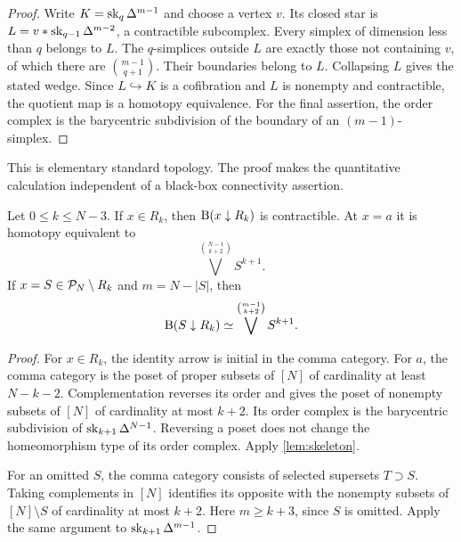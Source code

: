 \begin{proof}
Write $K=\operatorname{sk}_q\Delta^{m-1}$ and choose a vertex $v$. Its closed star is
$L=v*\operatorname{sk}_{q-1}\Delta^{m-2}$, a contractible subcomplex. Every simplex
of dimension less than $q$ belongs to $L$. The $q$-simplices outside $L$
are exactly those not containing $v$, of which there are
$\binom{m-1}{q+1}$. Their boundaries belong to $L$. Collapsing $L$
gives the stated wedge. Since $L\hookrightarrow K$ is a cofibration and
$L$ is nonempty and contractible, the quotient map is a homotopy
equivalence. For the final assertion, the order complex is the barycentric
subdivision of the boundary of an $(m-1)$-simplex.
\end{proof}

This is elementary standard topology. The proof makes the quantitative
calculation independent of a black-box connectivity assertion.

\begin{lemma}\label{lem:nerve}
Let $0\leq k\leq N-3$. If $x\in R_k$, then
$\mathrm B(x\downarrow R_k)$ is contractible. At $x=a$ it is homotopy
equivalent to
\begin{equation}\label{eq:anervecalc}
\bigvee^{\binom{N-1}{k+2}}S^{k+1}.
\end{equation}
If $x=S\in\mathcal P_N\setminus R_k$ and $m=N-|S|$, then
\begin{equation}\label{eq:facenervecalc}
\mathrm B(S\downarrow R_k)\simeq
\bigvee^{\binom{m-1}{k+2}}S^{k+1}.
\end{equation}
\end{lemma}

\begin{proof}
For $x\in R_k$, the identity arrow is initial in the comma category.
For $a$, the comma category is the poset of proper subsets of $[N]$ of
cardinality at least $N-k-2$. Complementation reverses its order and gives
the poset of nonempty subsets of $[N]$ of cardinality at most $k+2$.
Its order complex is the barycentric subdivision of
$\operatorname{sk}_{k+1}\Delta^{N-1}$. Reversing a poset does not change the
homeomorphism type of its order complex. Apply \cref{lem:skeleton}.

For an omitted $S$, the comma category consists of selected supersets
$T\supset S$. Taking complements in $[N]$ identifies its opposite with
the nonempty subsets of $[N]\setminus S$ of cardinality at most $k+2$.
Here $m\geq k+3$, since $S$ is omitted. Apply the same argument to
$\operatorname{sk}_{k+1}\Delta^{m-1}$.
\end{proof}


